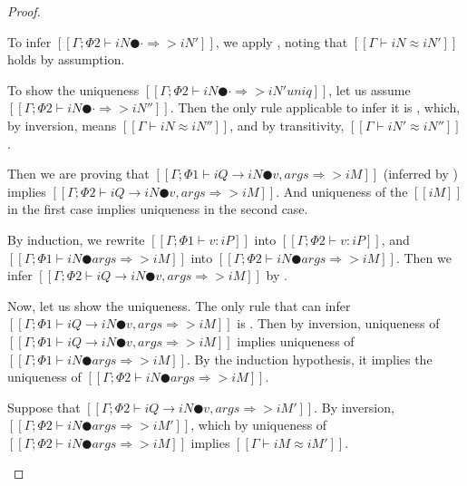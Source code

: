 \begin{proof}
\begin{caseof}
            To infer $[[Γ ; Φ2 ⊢ iN ● · ⇒> iN']]$, 
            we apply , noting that 
            $[[Γ ⊢ iN ≈ iN']]$ holds by assumption.

            To show the uniqueness $[[Γ ; Φ2 ⊢ iN ● · ⇒> iN' uniq]]$, 
            let us assume $[[Γ ; Φ2 ⊢ iN ● · ⇒> iN'']]$.
            Then the only rule applicable to infer it is ,
            which, by inversion, means $[[Γ ⊢ iN ≈ iN'']]$, and by transitivity, 
            $[[Γ ⊢ iN' ≈ iN'']]$.

        \item {}
            Then we are proving that 
            $[[Γ ; Φ1 ⊢ iQ → iN ● v, args ⇒> iM]]$ (inferred by )
            implies $[[Γ ; Φ2 ⊢ iQ → iN ● v, args ⇒> iM]]$.
            And uniqueness of the $[[iM]]$ in the first case implies uniqueness in the second case.

            By induction, we rewrite $[[Γ ; Φ1 ⊢ v : iP]]$ into $[[Γ ; Φ2 ⊢ v : iP]]$, 
            and $[[Γ ; Φ1 ⊢ iN ● args ⇒> iM]]$ into $[[Γ ; Φ2 ⊢ iN ● args ⇒> iM]]$.
            Then we infer $[[Γ ; Φ2 ⊢ iQ → iN ● v, args ⇒> iM]]$ by .

            Now, let us show the uniqueness.
            The only rule that can infer $[[Γ ; Φ1 ⊢ iQ → iN ● v, args ⇒> iM]]$
            is .
            Then by inversion, 
            uniqueness of $[[Γ ; Φ1 ⊢ iQ → iN ● v, args ⇒> iM]]$ implies
            uniqueness of $[[Γ ; Φ1 ⊢ iN ● args ⇒> iM]]$. By 
            the induction hypothesis, it implies the uniqueness of 
            $[[Γ ; Φ2 ⊢ iN ● args ⇒> iM]]$.


            Suppose that 
            $[[Γ ; Φ2 ⊢ iQ → iN ● v, args ⇒> iM']]$.
            By inversion, $[[Γ ; Φ2 ⊢ iN ● args ⇒> iM']]$, 
            which by uniqueness of $[[Γ ; Φ2 ⊢ iN ● args ⇒> iM]]$ implies
            $[[Γ ⊢ iM ≈ iM']]$.

        \item {}
    \end{caseof}
    
\end{proof}
